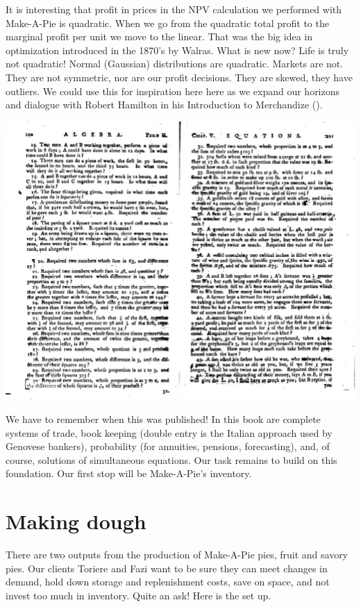 \documentclass[
]{book}
\begin{document}
It is interesting that profit in prices in the NPV calculation we performed with Make-A-Pie is quadratic. When we go from the quadratic total profit to the marginal profit per unit we move to the linear. That was the big idea in optimization introduced in the 1870's by Walras. What is new now? Life is truly not quadratic! Normal (Gaussian) distributions are quadratic. Markets are not. They are not symmetric, nor are our profit decisions. They are skewed, they have outliers. We could use this for inspiration here here as we expand our horizons and dialogue with Robert Hamilton in his Introduction to Merchandize (\citet{Hamilton1777}).

\includegraphics{images/04/hamilton-quadratic-problems.jpg}

We have to remember when this was published! In this book are complete systems of trade, book keeping (double entry is the Italian approach used by Genovese bankers), probability (for annuities, pensions, forecasting), and, of course, solutions of simultaneous equations. Our task remains to build on this foundation. Our first stop will be Make-A-Pie's inventory.

\hypertarget{making-dough}{%
\section{Making dough}\label{making-dough}}

There are two outputs from the production of Make-A-Pie pies, fruit and savory pies. Our clients Toriere and Fazi want to be sure they can meet changes in demand, hold down storage and replenishment costs, save on space, and not invest too much in inventory. Quite an ask! Here is the set up.
\end{document}
